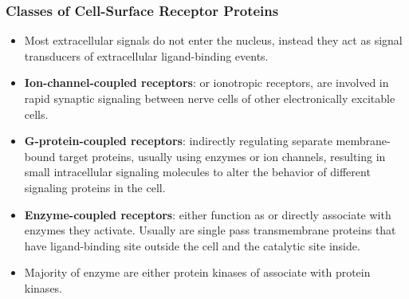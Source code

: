 \documentclass[12pt,a4paper]{article}
\begin{document}
\subsubsection{Classes of Cell-Surface Receptor Proteins}
\begin{itemize}
    \item Most extracellular signals do not enter the nucleus, instead they act as signal transducers of extracellular ligand-binding events.
    \item \textbf{Ion-channel-coupled receptors}: or ionotropic receptors, are involved in rapid synaptic signaling between nerve cells of other electronically excitable cells.
    \item \textbf{G-protein-coupled receptors}: indirectly regulating separate membrane-bound target proteins, usually using enzymes or ion channels, resulting in small intracellular signaling molecules to alter the behavior of different signaling proteins in the cell.
    \item \textbf{Enzyme-coupled receptors}: either function as or directly associate with enzymes they activate. Usually are single pass transmembrane proteins that have ligand-binding site outside the cell and the catalytic site inside.
    \item Majority of enzyme are either protein kinases of associate with protein kinases.
\end{itemize}
\end{document}
